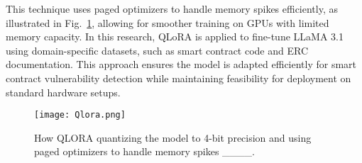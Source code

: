 This technique uses paged optimizers to handle memory spikes efficiently, as illustrated in Fig.~\ref{fig:qlora}, allowing for smoother training on GPUs with limited memory capacity. In this research, QLoRA is applied to fine-tune LLaMA 3.1 using domain-specific datasets, such as smart contract code and ERC documentation. This approach ensures the model is adapted efficiently for smart contract vulnerability detection while maintaining feasibility for deployment on standard hardware setups.

\begin{figure}[h!]
    \centering
    \texttt{[image: Qlora.png]}
    \caption{How QLORA quantizing the model to 4-bit precision and using paged optimizers to handle memory spikes ____.}
    \label{fig:qlora}
\end{figure}